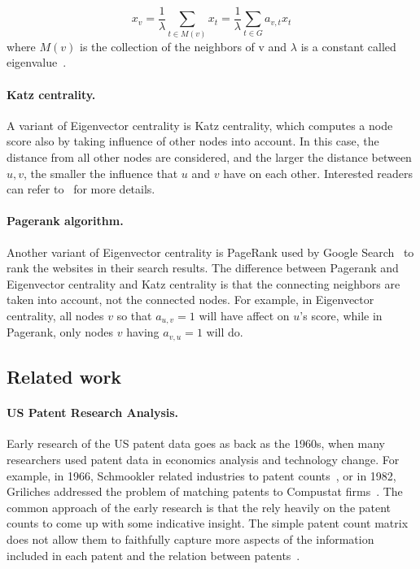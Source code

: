 \begin{equation}
	\label{eq:eigenvector}
	x_v = \frac{1}{\lambda} \sum_{t \in M(v)}x_t = \frac{1}{\lambda} \sum_{t \in G} a_{v,t}x_t
\end{equation}
where $M(v)$ is the collection of the neighbors of v and $\lambda$ is a
constant called eigenvalue~\cite{Eigenvecto-wiki}.

\paragraph{Katz centrality.}   A variant of Eigenvector centrality is Katz
centrality, which computes a node score also by taking influence of other
nodes into account. In this case, the distance from all other nodes are
considered, and the larger the distance between $u, v$, the smaller the
influence that $u$ and $v$ have on each other. Interested readers can refer 
to~\cite{katz-wiki} for more details.

\paragraph{Pagerank algorithm.}  Another variant of Eigenvector centrality is
PageRank used by Google Search~\cite{pagerank-wiki} to rank the websites in
their search results. The difference between Pagerank and Eigenvector
centrality and Katz centrality is that the connecting neighbors are taken into
account, not the connected nodes. For example, in Eigenvector centrality, all
nodes $v$ so that $a_{u, v}= 1$ will have affect on $u$'s score, while in
Pagerank, only nodes $v$ having $a_{v, u} = 1$ will do.


\subsection{Related work}
\paragraph{US Patent Research Analysis.} Early research of the US patent data goes
as back as the 1960s, when many researchers used patent data in economics
analysis and technology change. For example, in 1966,  Schmookler related 
industries to patent counts~\cite{Schmookler1966}, or in 1982, Griliches
addressed the problem of matching patents to Compustat
firms~\cite{Griliches1982}. The common approach of the early research is that
the rely heavily on the patent counts to come up with some indicative insight.
The simple patent count matrix does not allow them to faithfully capture more
aspects of the information included in each patent and the relation between
patents~\cite{Griliches1987}.

